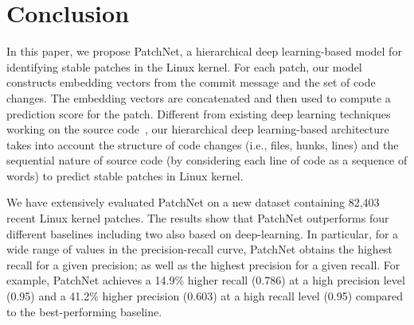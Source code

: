 \vspace{-0.1cm}
\section{Conclusion}
\label{sec:conclusion}

In this paper, we propose PatchNet, a hierarchical deep learning-based model for identifying stable patches in the Linux kernel. For each patch, our model constructs embedding vectors from the commit message and the set of code changes. The embedding vectors are concatenated and then used to compute a prediction score for the patch. Different from existing deep learning techniques working on the source code~\cite{white2016deep, wang2016automatically, huo2017enhancing, li2017cclearner, guo2017semantically, lam2017bug, gu2016deep}, our hierarchical deep learning-based architecture takes into account the structure of code changes (i.e., files, hunks, lines) and the sequential nature of source code (by considering each line of code as a sequence of words) to predict stable patches in Linux kernel. 


We have extensively evaluated PatchNet on a new dataset containing 82,403 recent Linux kernel patches. The results show that PatchNet outperforms 
four different baselines including two also based on deep-learning. In particular, for a wide range of values in the precision-recall curve, PatchNet obtains the highest recall for a given precision; as well as the highest precision for a given recall. For example, PatchNet achieves a 14.9\% higher recall (0.786) at a high precision level (0.95) and a 41.2\% higher precision (0.603) at a high recall level (0.95) compared to the best-performing baseline.


